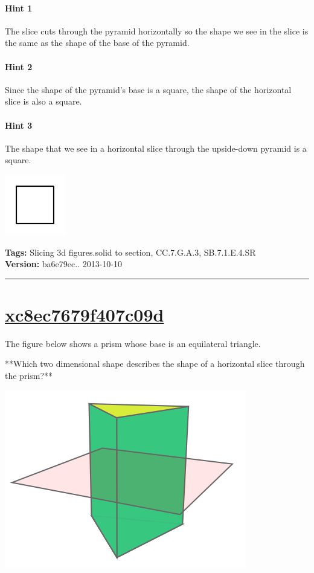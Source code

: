 \documentclass[twocolumn,10pt]{article}
\def\shrinkfactor{0.4}
\begin{document}
\paragraph{Hint 1}The slice cuts through the pyramid horizontally so the shape we see in the slice is the same as the shape of the base of the pyramid.

\paragraph{Hint 2}Since the shape of the pyramid's base is a square, the shape of the horizontal slice is also a square.

\paragraph{Hint 3}The shape that we see in a horizontal slice through the upside-down pyramid is a square.  

\includegraphics[scale=\shrinkfactor]{figures/4b59a0ece6acc7c19c389e1de534d1df93bf1169.png}



\medskip
\noindent
\textbf{Tags:} {\footnotesize Slicing 3d figures.solid to section, CC.7.G.A.3, SB.7.1.E.4.SR}\\
\textbf{Version:} ba6e79ec.. 2013-10-10
\smallskip\hrule





\section{\href{https://www.khanacademy.org/devadmin/content/items/xc8ec7679f407c09d}{xc8ec7679f407c09d}}

\noindent
The figure below shows a prism whose base is an equilateral triangle.

**Which two dimensional shape describes the shape of a horizontal slice through the prism?**  


\includegraphics[scale=\shrinkfactor]{figures/f12c7d1a9a889fab96bfd40a772ef7d4478018ad.png}
\end{document}
